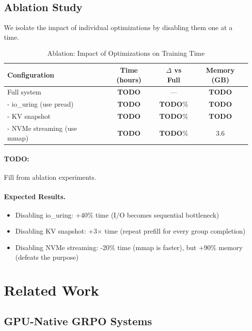 \documentclass[sigconf,review,anonymous]{acmart}
\begin{document}
\subsection{Ablation Study}

We isolate the impact of individual optimizations by disabling them one at a time.

\begin{table}[h]
\centering
\caption{Ablation: Impact of Optimizations on Training Time}
\label{tab:ablation}
\begin{tabular}{lccc}
\toprule
\textbf{Configuration} & \textbf{Time (hours)} & \textbf{$\Delta$ vs Full} & \textbf{Memory (GB)} \\
\midrule
Full system & \textbf{TODO} & --- & \textbf{TODO} \\
- io\_uring (use pread) & \textbf{TODO} & \textbf{TODO}\% & \textbf{TODO} \\
- KV snapshot & \textbf{TODO} & \textbf{TODO}\% & \textbf{TODO} \\
- NVMe streaming (use mmap) & \textbf{TODO} & \textbf{TODO}\% & 3.6 \\
\bottomrule
\end{tabular}
\end{table}

\paragraph{TODO:} Fill from ablation experiments.

\paragraph{Expected Results.}
\begin{itemize}
\item Disabling io\_uring: +40\% time (I/O becomes sequential bottleneck)
\item Disabling KV snapshot: +3$\times$ time (repeat prefill for every group completion)
\item Disabling NVMe streaming: -20\% time (mmap is faster), but +90\% memory (defeats the purpose)
\end{itemize}

\section{Related Work}

\subsection{GPU-Native GRPO Systems}
\end{document}
